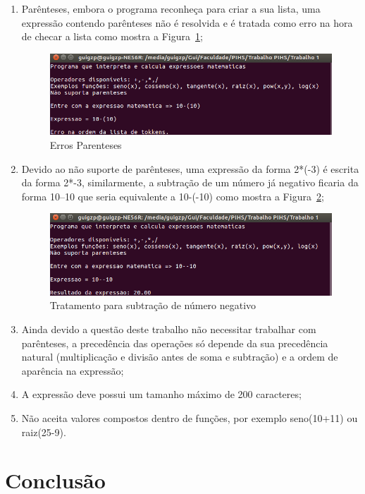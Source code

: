 \documentclass[12pt]{article}
\begin{document}
\begin{enumerate}
\item Parênteses, embora o programa reconheça para criar a sua lista, uma expressão contendo parênteses não é resolvida e é tratada como erro na hora de checar a lista como mostra a Figura~\ref{fig:erro_parenteses};

\begin{figure}[H]
\centering
\includegraphics[width=.5\textwidth]{Imagens/erro_parenteses.png}
\caption{Erros Parenteses}
\label{fig:erro_parenteses}
\end{figure}

\item Devido ao não suporte de parênteses, uma expressão da forma 2*(-3) é escrita da forma 2*-3, similarmente, a subtração de um número já negativo ficaria da forma 10--10 que seria equivalente a 10-(-10) como mostra a Figura~\ref{fig:menos};

\begin{figure}[H]
\centering
\includegraphics[width=.5\textwidth]{Imagens/dois_menos.png}
\caption{Tratamento para subtração de número negativo}
\label{fig:menos}
\end{figure}

\item Ainda devido a questão deste trabalho não necessitar trabalhar com parênteses, a precedência das operações só depende da sua precedência natural (multiplicação e divisão antes de soma e subtração) e a ordem de aparência na expressão;

\item A expressão deve possui um tamanho máximo de 200 caracteres;

\item Não aceita valores compostos dentro de funções, por exemplo seno(10+11) ou raiz(25-9).
\end{enumerate}

\section*{Conclusão}
\end{document}
